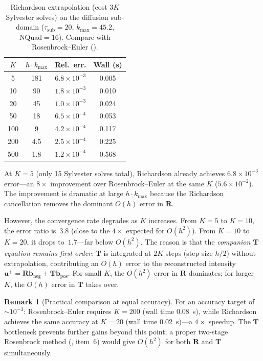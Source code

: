 \documentclass[11pt,a4paper]{article}
\newcommand{\vect}[1]{\bm{#1}}
\newcommand{\mat}[1]{\mathbf{#1}}
\newcommand{\tsub}{\tau_{\mathrm{sub}}}
\newcommand{\kmax}{k_{\max}}
\theoremstyle{definition}
\newtheorem{remark}{Remark}
\begin{document}
\begin{table}[h]\centering
\caption{Richardson extrapolation (cost $3K$ Sylvester solves) on the
diffusion sub-domain ($\tsub=20$, $\kmax=45.2$, NQuad${}=16$).
Compare with Rosenbrock--Euler ().}
\label{tab:richardson}
\begin{tabular}{cccc}
\toprule
$K$ & $h\cdot\kmax$ & Rel.\ err. & Wall (s) \\
\midrule
  5  & 181   & $6.8\times 10^{-3}$ & 0.005 \\
 10  &  90   & $1.8\times 10^{-3}$ & 0.010 \\
 20  &  45   & $1.0\times 10^{-3}$ & 0.024 \\
 50  &  18   & $6.5\times 10^{-4}$ & 0.053 \\
100  &   9   & $4.2\times 10^{-4}$ & 0.117 \\
200  & 4.5   & $2.5\times 10^{-4}$ & 0.225 \\
500  & 1.8   & $1.2\times 10^{-4}$ & 0.568 \\
\bottomrule
\end{tabular}
\end{table}

At $K=5$ (only 15 Sylvester solves total), Richardson already achieves
$6.8\times 10^{-3}$ error---an $8\times$ improvement over
Rosenbrock--Euler at the same $K$ ($5.6\times 10^{-2}$).  The
improvement is dramatic at large $h\cdot\kmax$ because the Richardson
cancellation removes the dominant $O(h)$ error in $\mat{R}$.

However, the convergence rate degrades as $K$ increases.  From $K=5$
to $K=10$, the error ratio is~$3.8$ (close to the $4\times$ expected
for $O(h^2)$).  From $K=10$ to $K=20$, it drops to~$1.7$---far below
$O(h^2)$.  The reason is that the \emph{companion $\mat{T}$ equation
remains first-order}: $\mat{T}$ is integrated at $2K$ steps (step size
$h/2$) without extrapolation, contributing an $O(h)$ error to the
reconstructed intensity $\vect{u}^+=\mat{R}\vect{b}_{\text{neg}}+
\mat{T}\vect{b}_{\text{pos}}$.  For small $K$, the $O(h^2)$ error in
$\mat{R}$ dominates; for larger $K$, the $O(h)$ error in $\mat{T}$
takes over.

\begin{remark}[Practical comparison at equal accuracy]\label{rem:rich_practical}
For an accuracy target of $\sim\!10^{-3}$: Rosenbrock--Euler requires
$K=200$ (wall time 0.08~s), while Richardson achieves the same accuracy
at $K=20$ (wall time 0.02~s)---a $4\times$ speedup.  The $\mat{T}$
bottleneck prevents further gains beyond this point; a proper two-stage
Rosenbrock method (, item~6) would give $O(h^2)$ for
both $\mat{R}$ and $\mat{T}$ simultaneously.
\end{remark}
\end{document}
